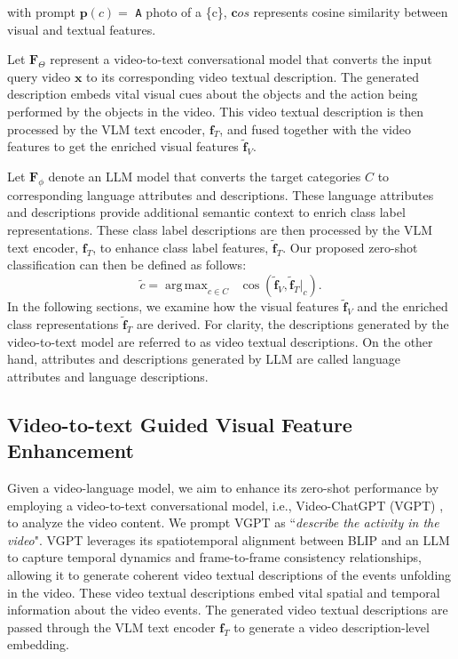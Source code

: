 \documentclass{article} \usepackage{iclr2024_conference,times}
\DeclareMathOperator*{\argmax}{arg\,max}
\begin{document}
with prompt $\bm{p}(c)=$ \texttt A photo of a \{c\},  $\bm cos$ represents cosine similarity between visual and textual features.

Let  $ \bm{F}_{\Theta}$ represent a video-to-text conversational model that converts the input query video $\bm{x}$ to its corresponding video textual description. The generated description embeds vital visual cues about the objects and the action being performed by the objects in the video. This video textual description is then processed by the VLM text encoder, $\bm{f}_{T}$, and fused together with the video features to get the enriched visual features $\bm{\tilde{f}}_V$.


Let  $\bm{F}_\phi$ denote an LLM model that converts the target categories $C$ to corresponding language attributes and descriptions. These language attributes and descriptions provide additional semantic context to enrich class label representations. These class label descriptions are then processed by the VLM text encoder, $\bm{f}_{T}$, to enhance class label features, $\bm{\tilde{f}}_T$. Our proposed zero-shot classification can then be defined as follows:
\begin{equation}
    \tilde{c} = \argmax_{c\in C} \;\; \cos (\bm{\tilde{f}}_V , \bm{\tilde{f}}_T\vert_c).
\end{equation}
In the following sections, we examine how the visual features $\bm{\tilde{f}}_V$ and the enriched class representations $\bm{\tilde{f}}_T$ are derived. For clarity, the descriptions generated by the video-to-text model \citep{maaz2023video} are referred to as video textual descriptions. On the other hand, attributes and descriptions generated by LLM \citep{brown2020language} are called language attributes and language descriptions.

\subsection{Video-to-text Guided Visual Feature Enhancement}
\label{subsec:Video-to-text Guided Visual Feature Enhancement}
Given a video-language model, we aim to enhance its zero-shot performance by employing a video-to-text conversational model, i.e., Video-ChatGPT (VGPT) \citep{maaz2023video}, to analyze the video content. We prompt VGPT as ``\emph{describe the activity in the video}". VGPT leverages its spatiotemporal alignment between BLIP \citep{li2022blip} and an LLM \citep{chiang2023vicuna} to capture temporal dynamics and frame-to-frame consistency relationships, allowing it to generate coherent video textual descriptions of the events unfolding in the video. These video textual descriptions embed vital spatial and temporal information about the video events. The generated video textual descriptions are passed through the VLM text encoder $\bm{f}_{T}$ to generate a video description-level embedding.
\end{document}
